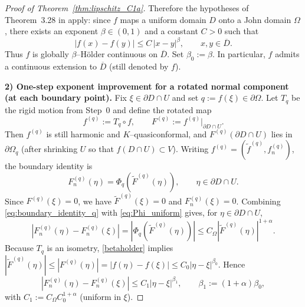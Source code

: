 \documentclass{amsart}
\begin{document}
\begin{proof}[Proof of Theorem~\ref{thm:lipschitz_C1a}]
Therefore the hypotheses of Theorem~3.28 in \cite{GehringMartio} apply: since $f$ maps a uniform domain $D$
onto a John domain $\Omega$, there exists an exponent $\beta\in(0,1)$ and a constant $C>0$ such that
\begin{equation}\label{betaholder}
|f(x)-f(y)|\le C\,|x-y|^{\beta},\qquad x,y\in \overline{D}.
\end{equation}
Thus $f$ is globally $\beta$--H\"older continuous on $\overline{D}$.
Set $\beta_0:=\beta$. In particular, $f$ admits a continuous extension to $\overline D$ (still denoted by $f$).


\medskip
\noindent\textbf{2) One-step exponent improvement for a rotated normal component (at each boundary point).}
Fix $\xi\in\partial D\cap U$ and set $q:=f(\xi)\in\partial\Omega$.
Let $T_q$ be the rigid motion from Step~0 and define the rotated map
\[
f^{(q)}:=T_q\circ f,\qquad F^{(q)}:=f^{(q)}|_{\partial D\cap U}.
\]
Then $f^{(q)}$ is still harmonic and $K$--quasiconformal, and $F^{(q)}(\partial D\cap U)$ lies in
$\partial\Omega_q$ (after shrinking $U$ so that $f(D\cap U)\subset V$).
Writing $f^{(q)}=(\tilde f^{(q)}, f^{(q)}_n)$, the boundary identity is
\begin{equation}\label{eq:boundary_identity_q}
F^{(q)}_n(\eta)=\Phi_q(\tilde F^{(q)}(\eta)),\qquad \eta\in\partial D\cap U.
\end{equation}
Since $F^{(q)}(\xi)=0$, we have $\tilde F^{(q)}(\xi)=0$ and $F^{(q)}_n(\xi)=0$.
Combining \eqref{eq:boundary_identity_q} with \eqref{eq:Phi_uniform} gives, for $\eta\in\partial D\cap U$,
\[
|F^{(q)}_n(\eta)-F^{(q)}_n(\xi)|
=|\Phi_q(\tilde F^{(q)}(\eta))|
\le C_\Omega |\tilde F^{(q)}(\eta)|^{1+\alpha}.
\]
Because $T_q$ is an isometry, \eqref{betaholder} implies
$|\tilde F^{(q)}(\eta)|\le |F^{(q)}(\eta)|=|f(\eta)-f(\xi)|\le C_0|\eta-\xi|^{\beta_0}$.
Hence
\begin{equation}\label{eq:improved_normal_trace}
|F^{(q)}_n(\eta)-F^{(q)}_n(\xi)|
\le C_1 |\eta-\xi|^{\beta_1},
\qquad
\beta_1:=(1+\alpha)\beta_0,
\end{equation}
with $C_1:=C_\Omega C_0^{1+\alpha}$ (uniform in $\xi$).


\end{proof}
\end{document}
